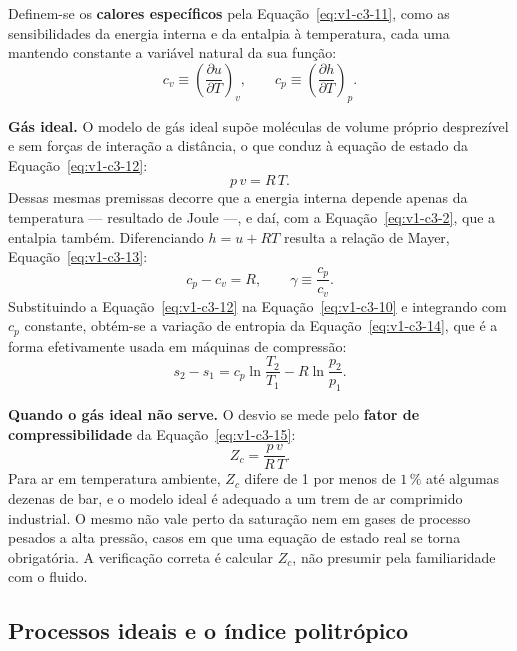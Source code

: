 \documentclass[12pt,a4paper]{article}
\numberwithin{equation}{section}
\numberwithin{table}{section}
\numberwithin{figure}{section}
\begin{document}
Definem-se os \textbf{calores específicos} pela Equação~\eqref{eq:v1-c3-11},
como as sensibilidades da energia interna e da entalpia à temperatura, cada uma
mantendo constante a variável natural da sua função:
\begin{equation}\label{eq:v1-c3-11}
c_v \equiv \left(\frac{\partial u}{\partial T}\right)_v,
\qquad
c_p \equiv \left(\frac{\partial h}{\partial T}\right)_p .
\end{equation}

\textbf{Gás ideal.} O modelo de gás ideal supõe moléculas de volume próprio
desprezível e sem forças de interação a distância, o que conduz à equação de
estado da Equação~\eqref{eq:v1-c3-12}:
\begin{equation}\label{eq:v1-c3-12}
p\,v = R\,T .
\end{equation}
Dessas mesmas premissas decorre que a energia interna depende apenas da
temperatura --- resultado de Joule ---, e daí, com a
Equação~\eqref{eq:v1-c3-2}, que a entalpia também. Diferenciando $h = u + RT$
resulta a relação de Mayer, Equação~\eqref{eq:v1-c3-13}:
\begin{equation}\label{eq:v1-c3-13}
c_p - c_v = R,
\qquad
\gamma \equiv \frac{c_p}{c_v} .
\end{equation}
Substituindo a Equação~\eqref{eq:v1-c3-12} na
Equação~\eqref{eq:v1-c3-10} e integrando com $c_p$ constante, obtém-se a
variação de entropia da Equação~\eqref{eq:v1-c3-14}, que é a forma efetivamente
usada em máquinas de compressão:
\begin{equation}\label{eq:v1-c3-14}
s_2 - s_1 = c_p \ln\!\frac{T_2}{T_1} - R \ln\!\frac{p_2}{p_1} .
\end{equation}

\textbf{Quando o gás ideal não serve.} O desvio se mede pelo \textbf{fator de
compressibilidade} da Equação~\eqref{eq:v1-c3-15}:
\begin{equation}\label{eq:v1-c3-15}
Z_c = \frac{p\,v}{R\,T} .
\end{equation}
Para ar em temperatura ambiente, $Z_c$ difere de 1 por menos de $1\,\%$ até
algumas dezenas de bar, e o modelo ideal é adequado a um trem de ar comprimido
industrial. O mesmo não vale perto da saturação nem em gases de processo
pesados a alta pressão, casos em que uma equação de estado real se torna
obrigatória. A verificação correta é calcular $Z_c$, não presumir pela
familiaridade com o fluido.

\subsection{Processos ideais e o índice politrópico}\label{sub:v1-c3-processos}
\end{document}
